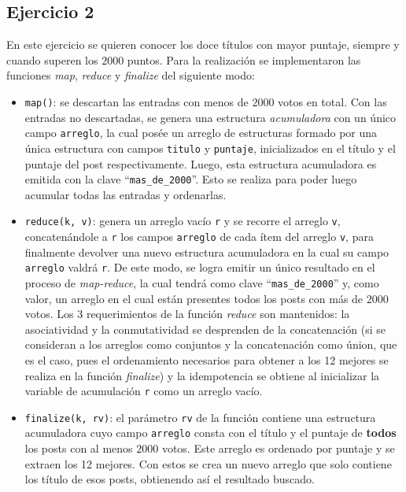 \documentclass[a4paper]{article}
\begin{document}
\subsection{Ejercicio 2}
En este ejercicio se quieren conocer los doce títulos con mayor puntaje,
siempre y cuando superen los $2000$ puntos. Para la realización se
implementaron las funciones \textit{map}, \textit{reduce} y \textit{finalize}
del siguiente modo:
\begin{itemize}
  \item \verb|map()|: se descartan las entradas con menos de $2000$ votos en
  total. Con las entradas no descartadas, se genera una estructura
  \textit{acumuladora} con un único campo \verb|arreglo|, la cual posée un
  arreglo de estructuras formado por una única estructura con campos
  \verb|titulo| y \verb|puntaje|, inicializados en el título y el puntaje del
  post respectivamente. Luego, esta estructura acumuladora es emitida con la
  clave ``\verb|mas_de_2000|''. Esto se realiza para poder luego acumular todas
  las entradas y ordenarlas.
  \item \verb|reduce(k, v)|: genera un arreglo vacío \verb|r| y se recorre el
  arreglo \verb|v|, concatenándole a \verb|r| los campos \verb|arreglo| de cada
  ítem del arreglo \verb|v|, para finalmente devolver una nuevo estructura
  acumuladora en la cual su campo \verb|arreglo| valdrá \verb|r|. De este modo,
  se logra emitir un único resultado en el proceso de \textit{map-reduce}, la
  cual tendrá como clave ``\verb|mas_de_2000|'' y, como valor, un arreglo en el
  cual están presentes todos los posts con más de $2000$ votos. Los 3
  requerimientos de la función \textit{reduce} son mantenidos: la asociatividad
  y la conmutatividad se desprenden de la concatenación (si se consideran a los
  arreglos como conjuntos y la concatenación como únion, que es el caso, pues
  el ordenamiento necesarios para obtener a los 12 mejores se realiza en la
  función \textit{finalize}) y la idempotencia se obtiene al inicializar la
  variable de acumulación \verb|r| como un arreglo vacío.
  \item \verb|finalize(k, rv)|: el parámetro \verb|rv| de la función contiene
  una estructura acumuladora cuyo campo \verb|arreglo| consta con el título y
  el puntaje de \textbf{todos} los posts con al menos $2000$ votos. Este
  arreglo es ordenado por puntaje y se extraen los 12 mejores. Con estos se
  crea un nuevo arreglo que solo contiene los título de esos posts, obtienendo
  así el resultado buscado.
\end{itemize}
\end{document}
